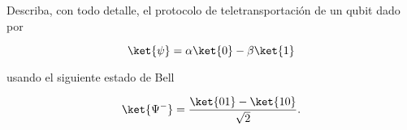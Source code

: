 \documentclass[./../main.tex]{subfiles}
\begin{document}

    \section{}

    Describa, con todo detalle, el protocolo de teletransportación de un qubit dado por

    \begin{equation*}
        \ket{\psi} = \alpha\ket{0} - \beta\ket{1}
    \end{equation*}

    usando el siguiente estado de Bell

    \begin{equation*}
        \ket{\Psi^{-}} = \dfrac{\ket{01} - \ket{10}}{\sqrt{2}}.
    \end{equation*}
\end{document}
